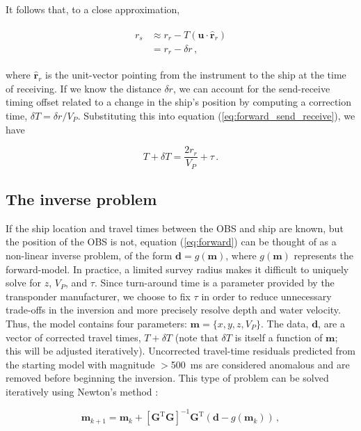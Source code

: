 It follows that, to a close approximation,

\begin{align}
\begin{split}
r_s &\approx r_r - T \left(\mathbf{u} \cdot \mathbf{\hat{r}}_r \right)\\
	&= r_r - \delta r \,,
\end{split}	
\end{align}

where $\mathbf{\hat{r}}_r$ is the unit-vector pointing from the instrument to the ship at the time of receiving. If we know the distance $\delta r$, we can account for the send-receive timing offset related to a change in the ship's position by computing a correction time, $\delta T = \delta r/V_P$. Substituting this into equation (\ref{eq:forward_send_receive}), we have

\begin{equation}
T + \delta T = \frac{2 r_r}{V_P} + \tau \,. \label{eq:forward}
\end{equation}

\subsection{The inverse problem}

If the ship location and travel times between the OBS and ship are known, but the position of the OBS is not, equation (\ref{eq:forward}) can be thought of as a non-linear inverse problem, of the form $ \mathbf{d} = g(\mathbf{m})$, where $g(\mathbf{m})$ represents the forward-model. In practice, a limited survey radius makes it difficult to uniquely solve for $z$, $V_P$, and $\tau$. Since turn-around time is a parameter provided by the transponder manufacturer, we choose to fix $\tau$ in order to reduce unnecessary trade-offs in the inversion and more precisely resolve depth and water velocity. Thus, the model contains four parameters: $\mathbf{m} = \{x,y,z,V_P\}$. The data, $\mathbf{d}$, are a vector of corrected travel times, $T+\delta T$ (note that $\delta T$ is itself a function of $\mathbf{m}$; this will be adjusted iteratively). Uncorrected travel-time residuals predicted from the starting model with magnitude $>$500~ms are considered anomalous and are removed before beginning the inversion. This type of problem can be solved iteratively using Newton's method \citep{Menke2018}:

\begin{equation}
	\mathbf{m}_{k+1} = \mathbf{m}_k + \left[\mathbf{G}^{\text{T}} \mathbf{G}\right]^{-1} \mathbf{G}^{\text{T}} \left(\mathbf{d} - g(\mathbf{m}_k)\right) \,,
\end{equation}

